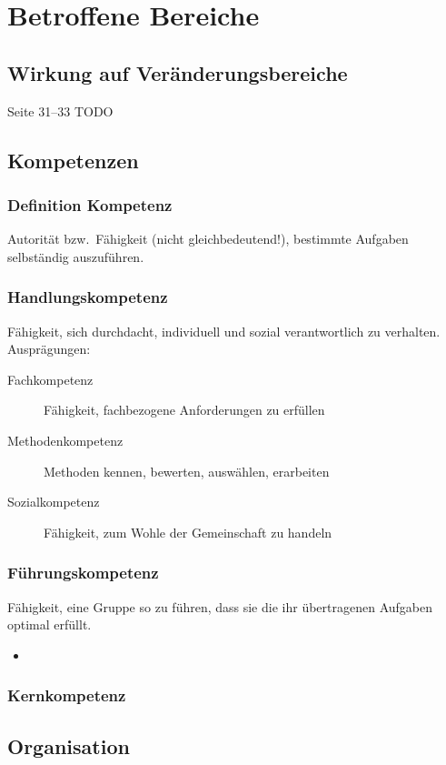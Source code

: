 \documentclass[a4paper, 12pt]{article}
\begin{document}
\section{Betroffene Bereiche}


\subsection{Wirkung auf Veränderungsbereiche}
Seite 31--33 TODO


\subsection{Kompetenzen}

\subsubsection*{Definition Kompetenz}
Autorität bzw.\ Fähigkeit (nicht gleichbedeutend!), bestimmte Aufgaben selbständig auszuführen.


\subsubsection*{Handlungskompetenz}
Fähigkeit, sich durchdacht, individuell und sozial verantwortlich zu verhalten. Ausprägungen:
\begin{description}
  \item[Fachkompetenz] Fähigkeit, fachbezogene Anforderungen zu erfüllen
  \item[Methodenkompetenz] Methoden kennen, bewerten, auswählen, erarbeiten
  \item[Sozialkompetenz] Fähigkeit, zum Wohle der Gemeinschaft zu handeln
\end{description}

\subsubsection*{Führungskompetenz}
Fähigkeit, eine Gruppe so zu führen, dass sie die ihr übertragenen Aufgaben optimal erfüllt.
\begin{itemize}
  \item 
\end{itemize}

\subsubsection*{Kernkompetenz}


\subsection{Organisation}
\end{document}
